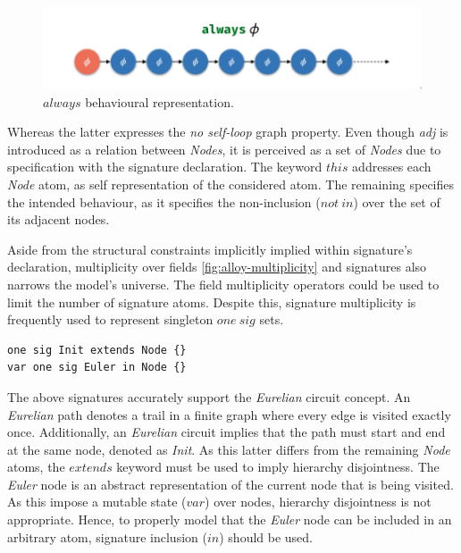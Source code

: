\begin{figure}[H]
    \centering
    \includegraphics[width=0.6\linewidth]{images/alloy_always.png}
    \caption{$always$ behavioural representation.}
    \label{fig:alloy-always}
\end{figure}

Whereas the latter expresses the \textit{no self-loop} graph property. Even though \textit{adj} is introduced as a relation between \textit{Nodes}, it is perceived as a set of \textit{Nodes} due to specification with the signature declaration. The keyword $this$ addresses each \textit{Node} atom, as self representation of the considered atom. The remaining specifies the intended behaviour, as it specifies the non-inclusion ($not\ in$) over the set of its adjacent nodes.


Aside from the structural constraints implicitly implied within signature's declaration, multiplicity over fields \ref{fig:alloy-multiplicity} and signatures also narrows the model's universe. The field multiplicity operators could be used to limit the number of signature atoms. Despite this, signature multiplicity is frequently used to represent singleton $one\ sig$ sets.

\begin{lstlisting}[title={\textit{Node} signature hierarchy.}, otherkeywords = {one, abstract, sig, module, var, set, fact, extends, no, in}, floatplacement=H]
one sig Init extends Node {}
var one sig Euler in Node {}
\end{lstlisting}

The above signatures accurately support the \textit{Eurelian} circuit concept. An \textit{Eurelian} path denotes a trail in a finite graph where every edge is visited exactly once. Additionally, an \textit{Eurelian} circuit implies that the path must start and end at the same node, denoted as \textit{Init}. As this latter differs from the remaining \textit{Node} atoms, the $extends$ keyword must be used to imply hierarchy disjointness. The \textit{Euler} node is an abstract representation of the current node that is being visited. As this impose a mutable state ($var$) over nodes, hierarchy disjointness is not appropriate. Hence, to properly model that the \textit{Euler} node can be included in an arbitrary atom, signature inclusion ($in$) should be used.

